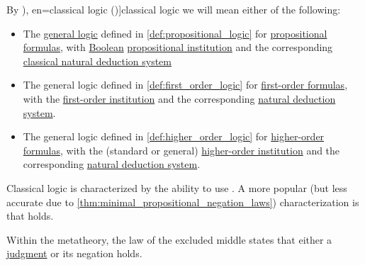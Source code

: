 \begin{concept}\label{con:classical_logic}\mimprovised
  By \term[ru=классическая логика (\cite[58]{ШеньВерещагин2017ЯзыкиИИсчисления}), en=classical logic (\cite[8]{TroelstraSchwichtenberg2000BasicProofTheory})]{classical logic} we will mean either of the following:
  \begin{itemize}
    \item The \hyperref[def:general_logic]{general logic} defined in \cref{def:propositional_logic} for \hyperref[def:propositional_formula]{propositional formulas}, with \hyperref[def:truth_value_algebra/classical]{Boolean} \hyperref[def:propositional_institution]{propositional institution} and the corresponding \hyperref[def:propositional_natural_deduction]{classical natural deduction system}

    \item The general logic defined in \cref{def:first_order_logic} for \hyperref[def:fol_formula]{first-order formulas}, with the \hyperref[def:fol_institution]{first-order institution} and the corresponding \hyperref[def:fol_natural_deduction]{natural deduction system}.

    \item The general logic defined in \cref{def:higher_order_logic} for \hyperref[def:hol_expression/formula]{higher-order formulas}, with the (standard or general) \hyperref[def:hol_institution]{higher-order institution} and the corresponding \hyperref[def:hol_natural_deduction]{natural deduction system}.
  \end{itemize}
\end{concept}
\begin{comments}
  \item Classical logic is characterized by the ability to use . A more popular (but less accurate due to \cref{thm:minimal_propositional_negation_laws}) characterization is that  holds.

  \item Within the metatheory, the law of the excluded middle states that either a \hyperref[con:judgment]{judgment} or its negation holds.
\end{comments}

